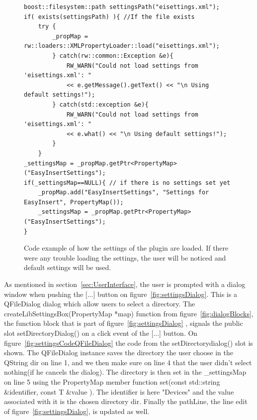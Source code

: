 \begin{figure}[h] %
\centering
\lstset{language=C++} 
\begin{lstlisting}[frame=single]  
boost::filesystem::path settingsPath("eisettings.xml"); 
if( exists(settingsPath) ){ //If the file exists
	try { 
		_propMap = rw::loaders::XMLPropertyLoader::load("eisettings.xml");
		} catch(rw::common::Exception &e){
			RW_WARN("Could not load settings from 'eisettings.xml': " 
			<< e.getMessage().getText() << "\n Using default settings!");
		} catch(std::exception &e){
 			RW_WARN("Could not load settings from 'eisettings.xml': " 
 			<< e.what() << "\n Using default settings!");
		}
	}
_settingsMap = _propMap.getPtr<PropertyMap>("EasyInsertSettings");
if(_settingsMap==NULL){ // if there is no settings set yet
	_propMap.add("EasyInsertSettings", "Settings for EasyInsert", PropertyMap());
	_settingsMap = _propMap.getPtr<PropertyMap>("EasyInsertSettings");
}	 
\end{lstlisting}
\caption{Code example of how the settings of the plugin are loaded. If there were any trouble loading the settings, the user will be noticed and default settings will be used.}
\label{fig:settingsCodeSetup} 	
\end{figure}

As mentioned in section~\ref{sec:UserInterface}, the user is prompted with a dialog window when pushing the [...] button on figure~\ref{fig:settingsDialog}. This is a QFileDialog \cite{QtDocumentationQFileDialog} dialog which allow users to select a directory. The createLibSettingsBox(PropertyMap *map) function from figure~\ref{fig:dialogBlocks}, the function block that is part of figure~\ref{fig:settingsDialog} , signals the public slot setDirectoryDialog() on a click event of the [...] button. On figure~\ref{fig:settingsCodeQFileDialog} the code from the setDirectorydialog() slot is shown. The QFileDialog instance saves the directory the user choose in the QString dir on line 1, and we then make sure on line 4 that the user didn't select nothing(if he cancels the dialog). The directory is then set in the \_settingsMap on line 5 using the PropertyMap member function set(const std::string \&identifier, const T \&value ). The identifier is here "Devices" and the value associated with it is the chosen directory dir. Finally the pathLine, the line edit of figure~\ref{fig:settingsDialog}, is updated as well.

